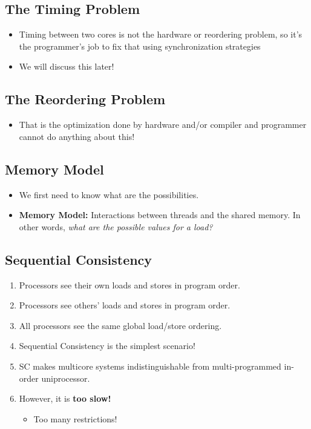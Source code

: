 \documentclass[10pt]{article}
\begin{document}
\subsection*{The Timing Problem}
\begin{itemize}
    \item Timing between two cores is not the hardware or reordering problem, so it's the programmer's job to fix that using synchronization strategies
    \item We will discuss this later!
\end{itemize}
\subsection*{The Reordering Problem}
\begin{itemize}
    \item That is the optimization done by hardware and/or compiler and programmer cannot do anything about this!
\end{itemize}

\subsection*{Memory Model}
\begin{itemize}
    \item We first need to know what are the possibilities.
    \item \textbf{Memory Model:} Interactions between threads and the shared memory.  In other words, \textit{what are the possible values for a load?}
\end{itemize}

\subsection*{Sequential Consistency}
\begin{enumerate}
    \item Processors see their own loads and stores in program order.
    \item Processors see others' loads and stores in program order.
    \item All processors see the same global load/store ordering.
    \item Sequential Consistency is the simplest scenario!
    \item SC makes multicore systems indistinguishable from multi-programmed in-order uniprocessor.
    \item However, it is \textbf{too slow!}
    \begin{itemize}
        \item Too many restrictions!
    \end{itemize}
\end{enumerate}
\end{document}
